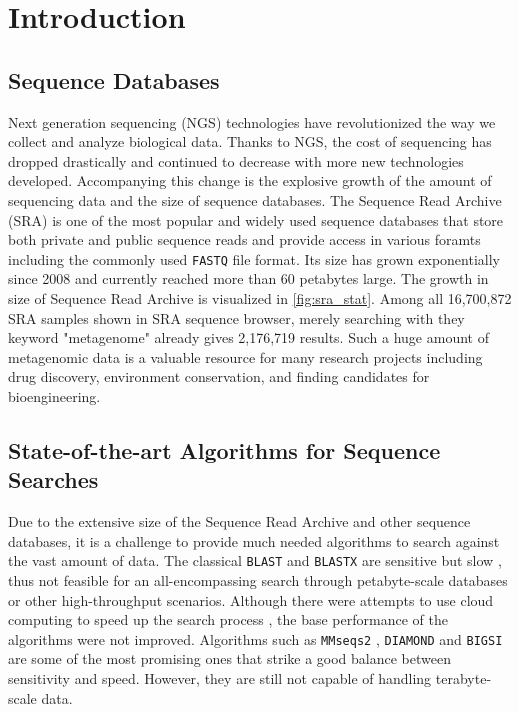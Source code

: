 
\chapter{Introduction}
\section{Sequence Databases}

Next generation sequencing (NGS) technologies have revolutionized the way we collect and analyze biological data.
Thanks to NGS, the cost of sequencing has dropped drastically and continued to decrease with more new technologies developed.
Accompanying this change is the explosive growth of the amount of sequencing data and the size of sequence databases.
The Sequence Read Archive (SRA) is one of the most popular and widely used sequence databases that store both private and public sequence reads and provide access in various foramts including the commonly used \texttt{FASTQ} file format.
Its size has grown exponentially since 2008 and currently reached more than 60 petabytes large.
The growth in size of Sequence Read Archive is visualized in \autoref{fig:sra_stat}.
Among all 16,700,872 SRA samples shown in SRA sequence browser, merely searching with they keyword "metagenome" already gives 2,176,719 results.
Such a huge amount of metagenomic data is a valuable resource for many research projects including drug discovery, environment conservation, and finding candidates for bioengineering.

\section{State-of-the-art Algorithms for Sequence Searches}

Due to the extensive size of the Sequence Read Archive and other sequence databases, it is a challenge to provide much needed algorithms to search against the vast amount of data.
The classical \texttt{BLAST} and \texttt{BLASTX} are sensitive but slow \cite{altschul1990basic}, thus not feasible for an all-encompassing search through petabyte-scale databases or other high-throughput scenarios.
Although there were attempts to use cloud computing to speed up the search process \cite{levi2018searching}, the base performance of the algorithms were not improved.
Algorithms such as \texttt{MMseqs2} \cite{steinegger2017mmseqs2}, \texttt{DIAMOND} \cite{buchfink2015fast} and \texttt{BIGSI} \cite{bradley2019ultrafast} are some of the most promising ones that strike a good balance between sensitivity and speed.
However, they are still not capable of handling terabyte-scale data.

